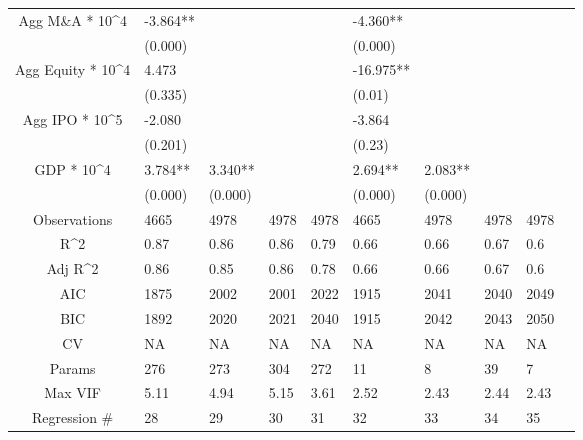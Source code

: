 \documentclass{article}
\begin{document}
\begin{table}[H]
\begin{tabular}{|clllllllll|}
  Agg M\&A * 10^4 & -3.864** &  &  &  & -4.360** &  &  &  & \\ 
   & (0.000) &  &  &  & (0.000) &  &  &  & \\ 
  Agg Equity * 10^4 & 4.473 &  &  &  & -16.975** &  &  &  & \\ 
   & (0.335) &  &  &  & (0.01) &  &  &  & \\ 
  Agg IPO * 10^5 & -2.080 &  &  &  & -3.864 &  &  &  & \\ 
   & (0.201) &  &  &  & (0.23) &  &  &  & \\ 
  GDP * 10^4 & 3.784** & 3.340** &  &  & 2.694** & 2.083** &  &  & \\ 
   & (0.000) & (0.000) &  &  & (0.000) & (0.000) &  &  & \\ 
  \hline 
 Observations & 4665 & 4978 & 4978 & 4978 & 4665 & 4978 & 4978 & 4978 & \\ 
  R^2 & 0.87 & 0.86 & 0.86 & 0.79 & 0.66 & 0.66 & 0.67 & 0.6 & \\ 
  Adj R^2 & 0.86 & 0.85 & 0.86 & 0.78 & 0.66 & 0.66 & 0.67 & 0.6 & \\ 
  AIC & 1875 & 2002 & 2001 & 2022 & 1915 & 2041 & 2040 & 2049 & \\ 
  BIC & 1892 & 2020 & 2021 & 2040 & 1915 & 2042 & 2043 & 2050 & \\ 
  CV & NA & NA & NA & NA & NA & NA & NA & NA & \\ 
  Params & 276 & 273 & 304 & 272 & 11 & 8 & 39 & 7 & \\ 
  Max VIF & 5.11 & 4.94 & 5.15 & 3.61 & 2.52 & 2.43 & 2.44 & 2.43 & \\ 
  Regression \# & 28 & 29 & 30 & 31 & 32 & 33 & 34 & 35 & \\ 
   \hline
\end{tabular}
 
\end{table}
\end{document}
